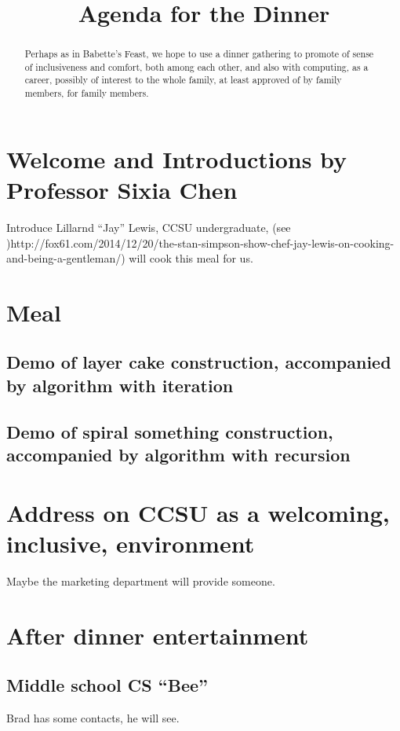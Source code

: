 \documentclass[]{article}
\title{Agenda for the Dinner}
\author{}
\begin{document}
\maketitle

\begin{abstract}
Perhaps as in Babette's Feast, we hope to use a dinner gathering to promote of sense of inclusiveness and comfort, both among each other, and also with computing, as a career, possibly of interest to the whole family, at least approved of by family members, for family members.
\end{abstract}

\section{Welcome and Introductions by Professor Sixia Chen}
Introduce Lillarnd ``Jay'' Lewis, CCSU undergraduate, (see )http://fox61.com/2014/12/20/the-stan-simpson-show-chef-jay-lewis-on-cooking-and-being-a-gentleman/)
will cook this meal for us.

\section{Meal}

\subsection{Demo of layer cake construction, accompanied by algorithm with iteration}

\subsection{Demo of spiral something construction, accompanied by algorithm with recursion}

\section{Address on CCSU as a welcoming, inclusive, environment}
Maybe the marketing department will provide someone.

\section{After dinner entertainment}

\subsection{Middle school CS ``Bee''}
Brad has some contacts, he will see.
\end{document}
